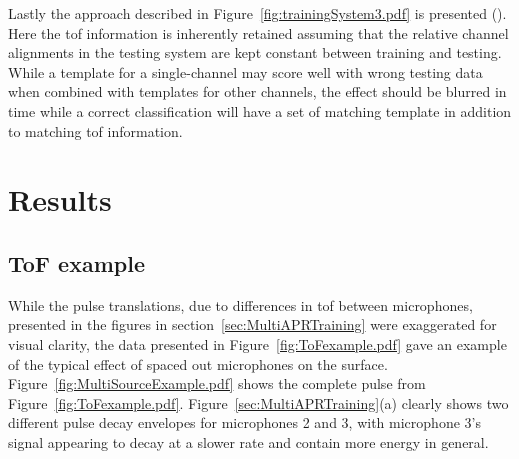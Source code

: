Lastly the approach described in Figure~\ref{fig:trainingSystem3.pdf} is presented (). Here the \gls{tof} information is inherently retained assuming that the relative channel alignments in the testing system are kept constant between training and testing. While a template for a single-channel may score well with wrong testing data when combined with templates for other channels, the effect should be blurred in time while a correct classification will have a set of matching template in addition to matching \gls{tof} information.

\section{Results}\label{sec:MultiAPRResults}
\subsection{ToF example}
While the pulse translations, due to differences in \gls{tof} between microphones, presented in the figures in section~\ref{sec:MultiAPRTraining} were exaggerated for visual clarity, the data presented in Figure~\ref{fig:ToFexample.pdf} gave an example of the typical effect of spaced out microphones on the surface. Figure~\ref{fig:MultiSourceExample.pdf} shows the complete pulse from Figure~\ref{fig:ToFexample.pdf}. Figure~\ref{sec:MultiAPRTraining}(a) clearly shows two different pulse decay envelopes for microphones 2 and 3, with microphone 3's signal appearing to decay at a slower rate and contain more energy in general.

